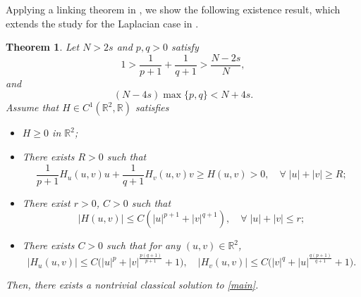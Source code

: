 \documentclass[10pt]{article}
\numberwithin{equation}{section}
\newtheorem{theorem}{Theorem}[section]
\newtheorem{remark}[theorem]{Remark}
\newcommand{\R}{\mathbb R}
\numberwithin{equation}{section}
\begin{document}
Applying a linking theorem in \cite{Felmer1993}, we show the following existence result, which extends the study for the Laplacian case in \cite{dF1994}.
\begin{theorem}\label{220516}
Let $N>2s$ and $p, q>0$ satisfy \begin{equation}\label{condition}
 1>\frac1{p+1}+\frac1{q+1}>\frac{N-2s}{N},
\end{equation}
 and
\begin{equation}\label{Condition_pq}
(N-4s)\max\{p, q\}<N+4s.
\end{equation}
Assume that $H \in C^1(\mathbb{R}^2, \mathbb{R})$ satisfies
\begin{itemize}
\item[$(H1)$] $H \ge 0$ in $\mathbb{R}^2$;
\item[$(H2)$] There exists $R>0$ such that
\begin{equation}\label{2212032128}
\frac{1}{p+1}H_u(u,v)u+\frac{1}{q+1}H_v(u,v)v\ge H(u,v)>0, \quad \forall\; |u|+|v|\ge R;
\end{equation}
\item[$(H3)$] There exist $r>0$, $C>0$ such that
\begin{equation}\label{2212051248}
|H(u,v)|\le C(|u|^{p+1}+|v|^{q+1}), \quad \forall \; |u|+|v|\le r;
\end{equation}
\item[$(H4)$] There exists $C>0$ such that for any $(u, v) \in \R^2$,
\begin{equation}\label{2211201618}
|H_u(u,v)|\le C\Big(|u|^p+|v|^\frac{p(q+1)}{p+1}+1\Big),\quad |H_v(u,v)|\le C\Big(|v|^q+|u|^\frac{q(p+1)}{q+1}+1\Big).
\end{equation}
\end{itemize}
Then, there exists a nontrivial classical solution to \eqref{main}.
\end{theorem}

\end{document}
